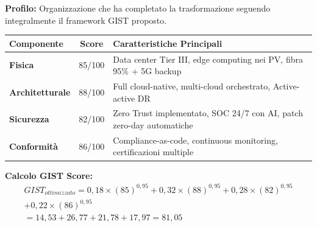 \begin{tcolorbox}[
    colback=green!5!white,
    colframe=green!75!black,
    title={\textbf{Scenario 3:} GDO con Framework GIST Completo},
    fonttitle=\bfseries,
    boxrule=1.5pt,
    arc=2mm,
    breakable,
    width=\textwidth
]

\textbf{Profilo:} Organizzazione che ha completato la trasformazione seguendo integralmente il framework GIST proposto.

\begin{center}
\begin{tabularx}{\textwidth}{l c X}
\toprule
\textbf{Componente} & \textbf{Score} & \textbf{Caratteristiche Principali} \\
\midrule
\textbf{Fisica} & 85/100 & Data center Tier III, edge computing nei PV, fibra 95\% + 5G backup \\
\textbf{Architetturale} & 88/100 & Full cloud-native, multi-cloud orchestrato, Active-active DR \\
\textbf{Sicurezza} & 82/100 & Zero Trust implementato, SOC 24/7 con AI, patch zero-day automatiche \\
\textbf{Conformità} & 86/100 & Compliance-as-code, continuous monitoring, certificazioni multiple \\
\bottomrule
\end{tabularx}
\end{center}

\textbf{Calcolo GIST Score:}
\begin{multline}
GIST_{ottimizzato} = 0,18 \times (85)^{0,95} + 0,32 \times (88)^{0,95} + 0,28 \times (82)^{0,95} \\ + 0,22 \times (86)^{0,95} \\
= 14,53 + 26,77 + 21,78 + 17,97 = \boxed{81,05}
\end{multline}

\end{tcolorbox}

